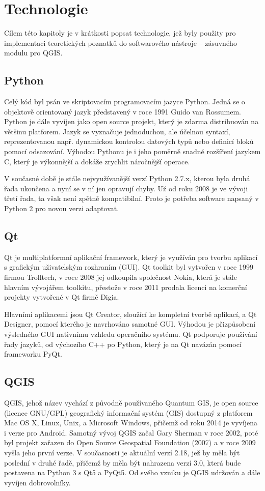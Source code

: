 \chapter{Technologie}
\label{3-technologie}
Cílem této kapitoly je v krátkosti popsat technologie, jež byly
použity pro implementaci teoretických poznatků do softwarového
nástroje – zásuvného modulu pro QGIS.
\section{Python}
Celý kód byl psán ve skriptovacím programovacím jazyce Python. Jedná
se o objektově orientovaný jazyk představený v roce 1991 Guido van
Rossumem. Python je dále vyvíjen jako open source projekt, který je
zdarma distribuován na většinu platforem. Jazyk se vyznačuje
jednoduchou, ale účelnou syntaxí, reprezentovanou např. dynamickou
kontrolou datových typů nebo definicí bloků pomocí odsazování. Výhodou
Pythonu je i jeho poměrně snadné rozšíření jazykem C, který je
výkonnější a dokáže zrychlit náročnější operace.

V současné době je stále nejvyužívanější verzí Python 2.7.x, kterou
byla druhá řada ukončena a nyní se v ní jen opravují chyby. Už od roku
2008 je ve vývoji třetí řada, ta však není zpětně kompatibilní. Proto
je potřeba software napsaný v Python 2 pro novou verzi adaptovat.
\section{Qt}
Qt je multiplatformní aplikační framework, který je využíván pro
tvorbu aplikací s grafickým uživatelským rozhraním (GUI). Qt toolkit
byl vytvořen v roce 1999 firmou Trolltech, v roce 2008 jej odkoupila
společnost Nokia, která je stále hlavním vývojářem toolkitu, přestože
v roce 2011 prodala licenci na komerční projekty vytvořené v Qt firmě
Digia.

Hlavními aplikacemi jsou Qt Creator, sloužící ke kompletní tvorbě
aplikací, a Qt Designer, pomocí kterého je navrhováno samotné
GUI. Výhodou je přizpůsobení výsledného GUI nativnímu vzhledu
operačního systému. Qt podporuje používání řady jazyků, od výchozího
C++ po Python, který je na Qt navázán pomocí frameworku PyQt.
\section{QGIS}
QGIS, jehož název vychází z původně používaného Quantum GIS, je open
source (licence GNU/GPL) geografický informační systém (GIS) dostupný
z platforem Mac OS X, Linux, Unix, a Microsoft Windows, přičemž od
roku 2014 je vyvíjena i verze pro Android. Samotný vývoj QGIS začal
Gary Sherman v roce 2002, poté byl projekt zařazen do Open Source
Geospatial Foundation (2007) a v roce 2009 vyšla jeho první verze. V
současnosti je aktuální verzí 2.18, jež by měla být poslední v druhé
řadě, přičemž by měla být nahrazena verzí 3.0, která bude postavena na
Python 3 s Qt5 a PyQt5. Od svého vzniku je QGIS udržován a dále
vyvíjen dobrovolníky.

